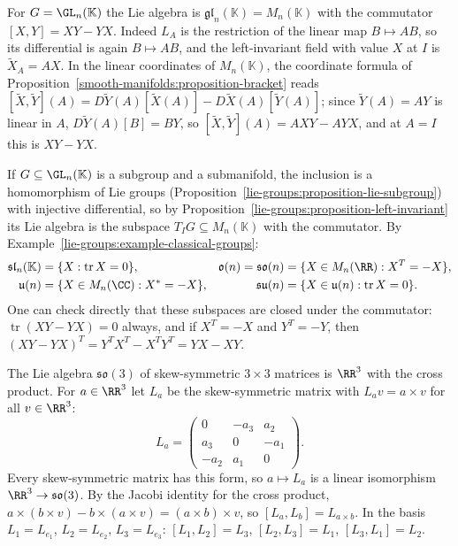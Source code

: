 \begin{example}\label{lie-groups:example-matrix-lie-algebras}
For $G = \GL_n(\mathbb{K})$ the Lie algebra is $\mathfrak{gl}_n(\mathbb{K}) = M_n(\mathbb{K})$ with the commutator $[X, Y] = XY - YX$. Indeed $L_A$ is the
restriction of the linear map $B \mapsto AB$, so its differential is again $B \mapsto AB$, and the left-invariant field with value $X$ at $I$ is
$\widetilde{X}_A = AX$. In the linear coordinates of $M_n(\mathbb{K})$, the coordinate formula of Proposition~\ref{smooth-manifolds:proposition-bracket} reads
$[\widetilde{X}, \widetilde{Y}](A) = D\widetilde{Y}(A)[\widetilde{X}(A)] - D\widetilde{X}(A)[\widetilde{Y}(A)]$; since $\widetilde{Y}(A) = AY$ is linear in
$A$, $D\widetilde{Y}(A)[B] = BY$, so $[\widetilde{X}, \widetilde{Y}](A) = AXY - AYX$, and at $A = I$ this is $XY - YX$.

If $G \subseteq \GL_n(\mathbb{K})$ is a subgroup and a submanifold, the inclusion is a homomorphism of Lie groups
(Proposition~\ref{lie-groups:proposition-lie-subgroup}) with injective differential, so by
Proposition~\ref{lie-groups:proposition-left-invariant} its Lie algebra is the subspace $T_IG \subseteq M_n(\mathbb{K})$ with the commutator. By
Example~\ref{lie-groups:example-classical-groups}:
\[
\begin{aligned}
\mathfrak{sl}_n(\mathbb{K}) &= \{X : \operatorname{tr}X = 0\}, & \mathfrak{o}(n) = \mathfrak{so}(n) &= \{X \in M_n(\RR) : X^T = -X\},\\
\mathfrak{u}(n) &= \{X \in M_n(\CC) : X^* = -X\}, & \mathfrak{su}(n) &= \{X \in \mathfrak{u}(n) : \operatorname{tr}X = 0\}.
\end{aligned}
\]
One can check directly that these subspaces are closed under the commutator: $\operatorname{tr}(XY - YX) = 0$ always, and if $X^T = -X$ and $Y^T = -Y$, then
$(XY - YX)^T = Y^TX^T - X^TY^T = YX - XY$.
\end{example}

\begin{example}\label{lie-groups:example-so3}
The Lie algebra $\mathfrak{so}(3)$ of skew-symmetric $3 \times 3$ matrices is $\RR^3$ with the cross product. For $a \in \RR^3$ let $L_a$ be the skew-symmetric
matrix with $L_av = a \times v$ for all $v \in \RR^3$:
\[
L_a = \begin{pmatrix} 0 & -a_3 & a_2\\ a_3 & 0 & -a_1\\ -a_2 & a_1 & 0\end{pmatrix}.
\]
Every skew-symmetric matrix has this form, so $a \mapsto L_a$ is a linear isomorphism $\RR^3 \to \mathfrak{so}(3)$. By the Jacobi identity for the cross
product, $a \times (b \times v) - b \times (a \times v) = (a \times b) \times v$, so $[L_a, L_b] = L_{a \times b}$. In the basis $L_1 = L_{e_1}$, $L_2 = L_{e_2}$,
$L_3 = L_{e_3}$: $[L_1, L_2] = L_3$, $[L_2, L_3] = L_1$, $[L_3, L_1] = L_2$.
\end{example}


